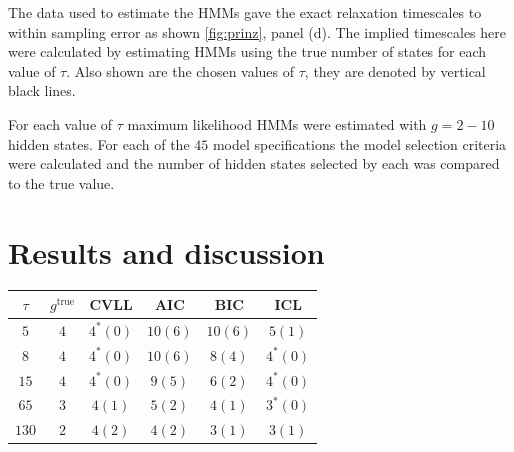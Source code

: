 The data used to estimate the HMMs gave the exact relaxation timescales to within sampling error as shown  \ref{fig:prinz}, panel (d).  The implied timescales here were calculated by estimating HMMs using the true number of states for each value of $\tau$.  Also shown are the chosen values of $\tau$, they are denoted by vertical black lines. 

For each value of $\tau$ maximum likelihood HMMs were estimated with $g = 2 - 10$ hidden states. For each of the $45$ model specifications the model selection criteria were calculated  and the number of hidden states selected by each was compared to the true value. 

\section{Results and discussion}\label{sec:hmm_results}
\begin{table}
    \centering
    \begin{tabular}{|c|c|c|c|c|c|}
    \hline
    $\tau$ & $g^{\mathrm{true}}$ & CVLL & AIC & BIC & ICL  \\
    \hline\hline
     $5$  & $4$ & $4^{*} (0)$  & $10 (6)$ & $10 (6)$ & $5 (1)$ \\
     $8$  & $4$ & $4^{*} (0)$ & $10 (6)$ & $8 (4)$  & $4^{*} (0)$  \\
     $15$ & $4$ & $4^{*} (0)$  & $9 (5)$ & $6 (2)$  & $4^{*} (0)$  \\
     $65 $& $3$ & $4 (1)$  & $5 (2)$  & $4 (1)$  & $3^{*} (0)$  \\
     $130$& $2$ & $4 (2)$  & $4 (2)$  & $3 (1)$  & $3 (1)$  \\
     \hline
    \end{tabular}
    \label{tab:prinz_criteria_results}
\end{table}

